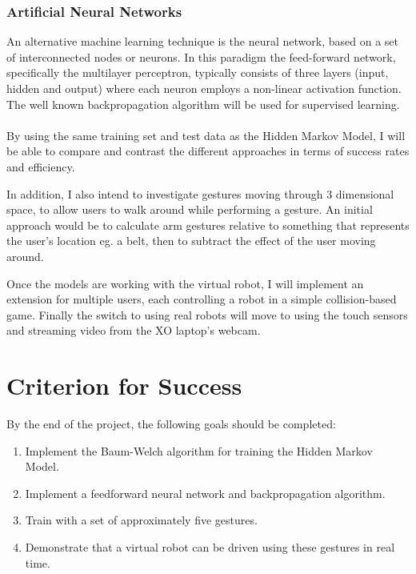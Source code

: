 \subsubsection*{Artificial Neural Networks}
An alternative machine learning technique is the neural network, based on a set of interconnected nodes or neurons. In this paradigm the feed-forward network, specifically the multilayer perceptron, typically consists of three layers (input, hidden and output) where each neuron employs a non-linear activation function. The well known backpropagation algorithm will be used for supervised learning.

\paragraph{}

By using the same training set and test data as the Hidden Markov Model, I will be able to compare and contrast the different approaches in terms of success rates and efficiency.

In addition, I also intend to investigate gestures moving through 3 dimensional space, to allow users to walk around while performing a gesture. An initial approach would be to calculate arm gestures relative to something that represents the user's location eg. a belt, then to subtract the effect of the user moving around.

Once the models are working with the virtual robot, I will implement an extension for multiple users, each controlling a robot in a simple collision-based game. Finally the switch to using real robots will move to using the touch sensors and streaming video from the XO laptop's webcam.

\section*{Criterion for Success}

By the end of the project, the following goals should be completed:

\begin{enumerate}

\item Implement the Baum-Welch algorithm for training the Hidden Markov Model.

\item Implement a feedforward neural network and backpropagation algorithm.

\item Train with a set of approximately five gestures.

\item Demonstrate that a virtual robot can be driven using these gestures in real time.

\end{enumerate}


